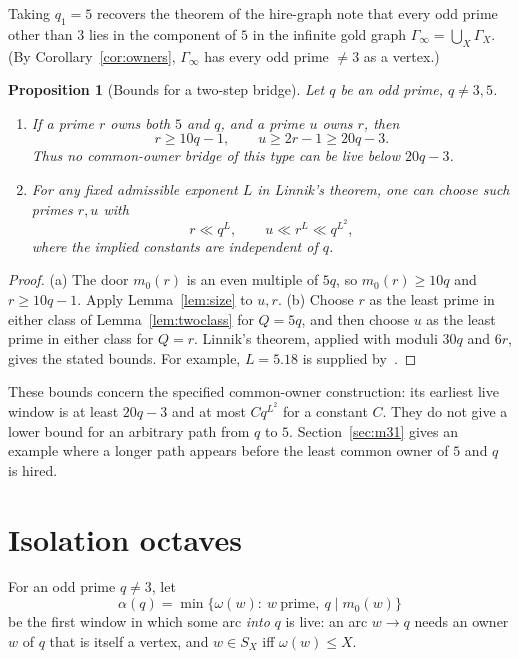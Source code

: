 \documentclass[11pt,a4paper]{article}
\newtheorem{proposition}[theorem]{Proposition}
\theoremstyle{remark}
\begin{document}
Taking \(q_1=5\) recovers the theorem of the hire-graph note that every odd prime other than \(3\) lies in the component of \(5\) in the infinite gold graph \(\Gamma_\infty=\bigcup_X\Gamma_X\).
(By Corollary~\ref{cor:owners}, \(\Gamma_\infty\) has every odd prime \(\ne 3\) as a vertex.)

\begin{proposition}[Bounds for a two-step bridge]\label{prop:times}
Let \(q\) be an odd prime, \(q\ne3,5\).
\begin{enumerate}
\item[(a)] If a prime \(r\) owns both \(5\) and \(q\), and a prime \(u\) owns \(r\), then
\[
r\ge10q-1,\qquad u\ge2r-1\ge20q-3.
\]
Thus no common-owner bridge of this type can be live below \(20q-3\).
\item[(b)] For any fixed admissible exponent \(L\) in Linnik's theorem, one can choose such primes \(r,u\) with
\[
r\ll q^L,\qquad u\ll r^L\ll q^{L^2},
\]
where the implied constants are independent of \(q\).
\end{enumerate}
\end{proposition}
\begin{proof}
(a) The door \(m_0(r)\) is an even multiple of \(5q\), so \(m_0(r)\ge10q\) and \(r\ge10q-1\). Apply Lemma~\ref{lem:size} to \(u,r\).
(b) Choose \(r\) as the least prime in either class of Lemma~\ref{lem:twoclass} for \(Q=5q\), and then choose \(u\) as the least prime in either class for \(Q=r\).
Linnik's theorem, applied with moduli \(30q\) and \(6r\), gives the stated bounds. For example, \(L=5.18\) is supplied by~\cite[Theorem~1.1]{Xylouris}.
\end{proof}

These bounds concern the specified common-owner construction: its earliest live window is at least \(20q-3\) and at most \(Cq^{L^2}\) for a constant \(C\).
They do not give a lower bound for an arbitrary path from \(q\) to \(5\).
Section~\ref{sec:m31} gives an example where a longer path appears before the least common owner of \(5\) and \(q\) is hired.

\section{Isolation octaves}\label{sec:octave}

For an odd prime \(q\ne3\), let
\[
\alpha(q)=\min\{\omega(w):\ w\ \text{prime},\ q\mid m_0(w)\}
\]
be the first window in which some arc \emph{into} \(q\) is live: an arc \(w\to q\) needs an owner \(w\) of \(q\) that is itself a vertex, and \(w\in S_X\) iff \(\omega(w)\le X\).
\end{document}
